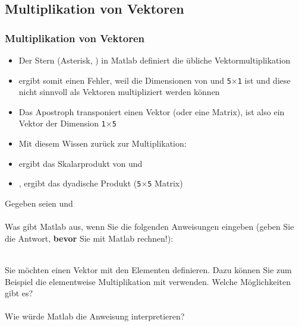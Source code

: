     \subsection{Multiplikation von Vektoren}

    \begin{frame}
      \frametitle{Multiplikation von Vektoren}
      \begin{itemize}
          \item Der Stern (Asterisk, \matlabInput{*}) in Matlab definiert die übliche Vektormultiplikation
          \item {} ergibt somit einen Fehler, weil die Dimensionen von  und 
          \texttt{5$\times$1} ist und diese nicht sinnvoll als Vektoren multipliziert werden können
          \item Das Apostroph  transponiert einen Vektor (oder eine Matrix),  ist also ein Vektor
          der Dimension \texttt{1$\times$5}
          \item Mit diesem Wissen zurück zur Multiplikation:
          \item {} ergibt das Skalarprodukt von  und 
          \item {}, ergibt das dyadische Produkt (\texttt{5$\times$5} Matrix)
      \end{itemize}
    \end{frame}

    \secMexercise
    \begin{frame}
      \frameMexercise
      \begin{exercise}
          \sloppy
          Gegeben seien  und \\ \\

          Was gibt Matlab aus, wenn Sie die folgenden Anweisungen eingeben (geben Sie die Antwort, \textbf{bevor} Sie mit Matlab rechnen!):\\ \\

      \end{exercise}
    \end{frame}

    \secMexercise
    \begin{frame}
      \frameMexercise
      \begin{exercise}
          \sloppy
          Sie möchten einen Vektor  mit den Elementen  definieren.
          Dazu können Sie zum Beispiel die elementweise Multiplikation mit \matlabInput{$\pi$} verwenden. Welche Möglichkeiten gibt es? \\ \\

          Wie würde Matlab die Anweisung  interpretieren?
      \end{exercise}
    \end{frame}

